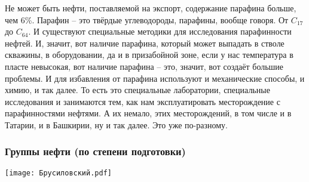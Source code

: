 \documentclass[main.tex]{subfiles}
\begin{document}
Не может быть нефти, поставляемой на экспорт, содержание парафина больше, чем 6\%.
Парафин -- это твёрдые углеводороды, парафины, вообще говоря.
От $C_{17}$ до $C_{64}$.
И существуют специальные методики для исследования парафинности нефтей.
И, значит, вот наличие парафина, который может выпадать в стволе скважины, в оборудовании, да и в призабойной зоне, если у нас температура в пласте невысокая, вот наличие парафина -- это, значит, вот создаёт большие проблемы.
И для избавления от парафина используют и механические способы, и химию, и так далее.
То есть это специальные лаборатории, специальные исследования и занимаются тем, как нам эксплуатировать месторождение с парафинностями нефтями.
А их немало, этих месторождений, в том числе и в Татарии, и в Башкирии, ну и так далее.
Это уже по-разному.

\subsubsection{Группы нефти (по степени подготовки)}

\begin{center}
\texttt{[image: Брусиловский.pdf]}
\end{center}
\end{document}
